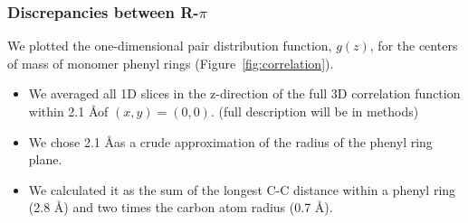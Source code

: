 \documentclass{article}
\begin{document}

  \subsubsection{Discrepancies between R-$\pi$}\label{section:rpi}
  
  We plotted the one-dimensional pair distribution function, $g(z)$, for the centers
  of mass of monomer phenyl rings (Figure~\ref{fig:correlation}).
  \begin{itemize}
  		\item We averaged all 1D slices in the z-direction of the full 3D correlation function
  		within 2.1 \AA of $(x, y)=(0, 0)$. (full description will be in methods)
  		\item We chose 2.1 \AA as a crude approximation of the radius of the phenyl ring
  		plane. 
  		\item We calculated it as the sum of the longest C-C distance within a phenyl 
  		ring (2.8 \AA) and two times the carbon atom radius (0.7 \AA).
  \end{itemize}
  
\end{document}
